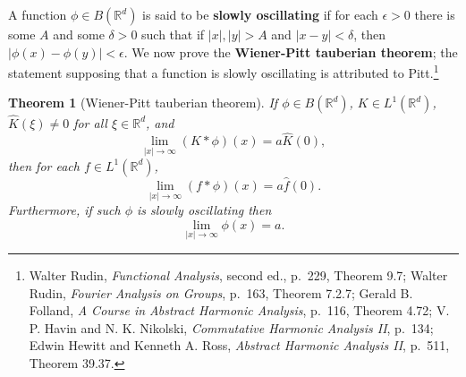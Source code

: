 \documentclass{article}
\newtheorem{theorem}{Theorem}
\theoremstyle{definition}
\begin{document}
A function $\phi \in B(\mathbb{R}^d)$ is said to be \textbf{slowly oscillating} if for each $\epsilon>0$ there is some $A$ and some $\delta>0$ such that
if $|x|,|y|>A$ and $|x-y|<\delta$, then $|\phi(x)-\phi(y)|<\epsilon$. We now prove the \textbf{Wiener-Pitt tauberian theorem}; the statement 
supposing that a function is slowly oscillating is attributed to Pitt.\footnote{Walter Rudin, {\em Functional Analysis}, second ed.,
p.~229, Theorem 9.7; Walter Rudin, {\em Fourier Analysis on Groups}, p.~163, Theorem 7.2.7; Gerald B. Folland, {\em A Course in Abstract
Harmonic Analysis}, p.~116, Theorem 4.72; V. P. Havin and N. K. Nikolski,
{\em Commutative Harmonic Analysis II}, p.~134; Edwin Hewitt and Kenneth
A. Ross, {\em Abstract Harmonic Analysis II}, p.~511, Theorem 39.37.}

\begin{theorem}[Wiener-Pitt tauberian theorem]
If $\phi \in B(\mathbb{R}^d)$, $K \in L^1(\mathbb{R}^d)$, $\hat{K}(\xi) \neq 0$ for all $\xi \in \mathbb{R}^d$, and
\[
\lim_{|x| \to \infty} (K*\phi)(x)=a \hat{K}(0),
\]
then  for each $f \in L^1(\mathbb{R}^d)$,
\begin{equation}
\lim_{|x| \to \infty} (f*\phi)(x) = a\hat{f}(0).
\label{claim1}
\end{equation}
Furthermore, if such $\phi$ is slowly oscillating then
\begin{equation}
\lim_{|x| \to \infty} \phi(x) = a.
\label{claim2}
\end{equation}
\end{theorem}
\end{document}
